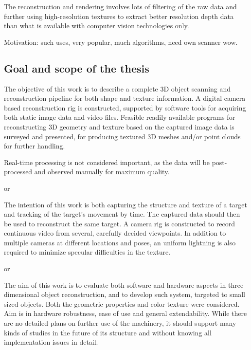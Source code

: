 
The reconstruction and rendering involves lots of filtering of the raw data and further using high-resolution textures to extract better resolution depth data than what is available with computer vision technologies only.


Motivation: such uses, very popular, much algorithms, need own scanner wow.

\subsection{Goal and scope of the thesis}



The objective of this work is to describe a complete 3D object scanning and reconstruction pipeline for both shape and texture information.
A digital camera based reconstruction rig is constructed, supported by software tools for acquiring both static image data and video files.
Feasible readily available programs for reconstructing 3D geometry and texture based on the captured image data is surveyed and presented, for producing textured 3D meshes and/or point clouds for further handling.

Real-time processing is not considered important, as the data will be post-processed and observed manually for maximum quality.

or

The intention of this work is both capturing the structure and texture of a target and tracking of the target's movement by time.
The captured data should then be used to reconstruct the same target.
A camera rig is constructed to record continuous video from several, carefully decided viewpoints.
In addition to multiple cameras at different locations and poses, an uniform lightning is also required to minimize specular difficulties in the texture.

or

The aim of this work is to evaluate both software and hardware aspects in three-dimensional object reconstruction, and to develop such system, targeted to small sized objects.
Both the geometric properties and color texture were considered.
Aim is in hardware robustness, ease of use and general extendability. While there are no detailed plans on further use of the machinery, it should support many kinds of studies in the future of its structure and without knowing all implementation issues in detail.

